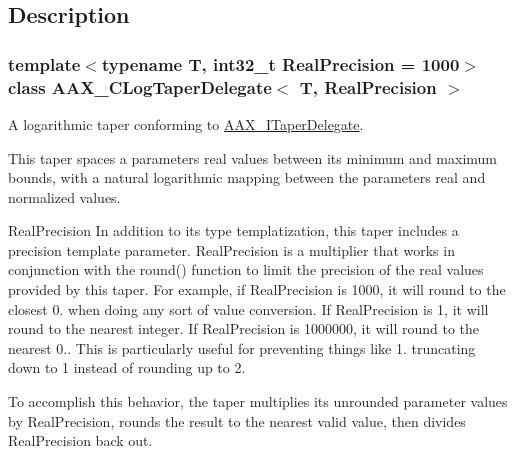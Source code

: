 \subsection{Description}
\subsubsection*{template$<$typename T, int32\+\_\+t Real\+Precision = 1000$>$class A\+A\+X\+\_\+\+C\+Log\+Taper\+Delegate$<$ T, Real\+Precision $>$}

A logarithmic taper conforming to \hyperlink{a00114}{A\+A\+X\+\_\+\+I\+Taper\+Delegate}. 

This taper spaces a parameter\textquotesingle{}s real values between its minimum and maximum bounds, with a natural logarithmic mapping between the parameter\textquotesingle{}s real and normalized values.

\begin{DoxyParagraph}{Real\+Precision}
In addition to its type templatization, this taper includes a precision template parameter. Real\+Precision is a multiplier that works in conjunction with the round() function to limit the precision of the real values provided by this taper. For example, if Real\+Precision is 1000, it will round to the closest 0. when doing any sort of value conversion. If Real\+Precision is 1, it will round to the nearest integer. If Real\+Precision is 1000000, it will round to the nearest 0.. This is particularly useful for preventing things like 1. truncating down to 1 instead of rounding up to 2.
\end{DoxyParagraph}
To accomplish this behavior, the taper multiplies its unrounded parameter values by Real\+Precision, rounds the result to the nearest valid value, then divides Real\+Precision back out.

